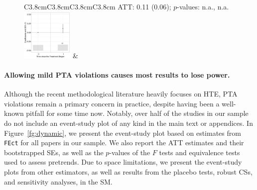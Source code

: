 \documentclass[12pt]{article}
\begin{document}
\begin{figure}[!ht]
\begin{minipage}{1\linewidth}
{{\begin{tabular}{C{3.8cm}C{3.8cm}C{3.8cm}C{3.8cm}}
   \citet{Zhang2021jop} \newline ATT: 0.11 (0.06); \newline $p$-values: n.a., n.a.  \\
   \hspace{-2em} \includegraphics[width = 0.22\textwidth]{figure/fect/zhang_fect_entry.png} &
    \\ 
\end{tabular}}}
\end{minipage}\vspace{-0.5em}
\end{figure}

\paragraph*{Allowing mild PTA violations causes most results to lose power.} Although the recent methodological literature heavily focuses on HTE, PTA violations remain a primary concern in practice, despite having been a well-known pitfall for some time now. Notably, over half of the studies in our sample do not include an event-study plot of any kind in the main text or appendices. In Figure~\ref{fg:dynamic}, we present the event-study plot based on estimates from \texttt{FEct} for all papers in our sample. We also report the ATT estimates and their bootstrapped SEs, as well as the $p$-values of the $F$ tests and equivalence tests used to assess pretrends. Due to space limitations, we present the event-study plots from other estimators, as well as results from the placebo tests, robust CSs, and sensitivity analyses, in the SM. 
\end{document}
